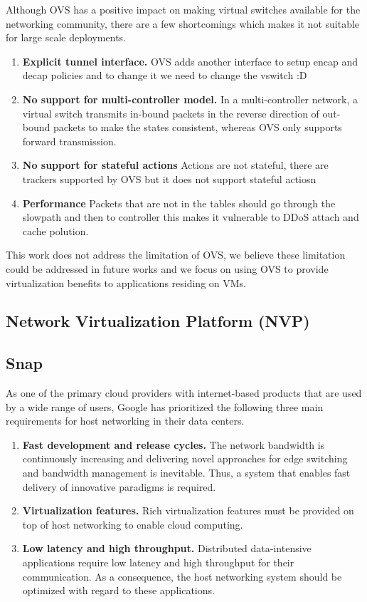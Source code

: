 Although OVS has a positive impact on making virtual switches available for the networking community, there are a few shortcomings which makes it not suitable for large scale deployments.

\begin{enumerate}
    \item \textbf{Explicit tunnel interface.} OVS adds another interface to setup encap and decap policies and to change it we need to change the vswitch :D %
    \item \textbf{No support for multi-controller model.} In a multi-controller network, a virtual switch transmits in-bound packets in the reverse direction of out-bound packets to make the states consistent, whereas OVS only supports forward transmission. 
    \item \textbf{No support for stateful actions} Actions are not stateful, there are trackers supported by OVS but it does not support stateful actiosn %
    \item \textbf{Performance} Packets that are not in the tables should go through the slowpath and then to controller this makes it vulnerable to DDoS attach and cache polution.  %
\end{enumerate}
This work does not address the limitation of OVS, we believe these limitation could be addressed in future works and we focus on using OVS to provide virtualization benefits to applications residing on VMs. %
\subsection{Network Virtualization Platform (NVP)}
\label{nvp}

\subsection{Snap}
\label{snap}


As one of the primary cloud providers with internet-based products 
that are used by a wide range of users, Google has prioritized 
the following three main requirements for host networking in their data centers. 

\begin{enumerate}
    \item \textbf{Fast development and release cycles.} The network bandwidth is continuously increasing and delivering novel approaches for edge switching and bandwidth management is inevitable. Thus, a system that enables fast delivery of innovative paradigms is required.
    \item \textbf{Virtualization features.} Rich virtualization features must be provided on top of host networking to enable cloud computing.
    \item \textbf{Low latency and high throughput.} Distributed data-intensive applications require low latency and high throughput for their communication. As a consequence, the  host networking system should be optimized with regard to these applications.
\end{enumerate}

